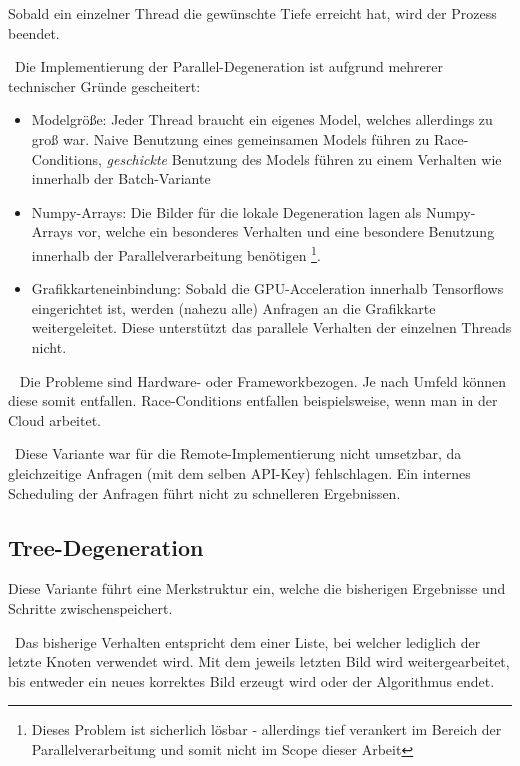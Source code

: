 Sobald ein einzelner Thread die gewünschte Tiefe erreicht hat, wird der Prozess beendet. 

~\newline Die Implementierung der Parallel-Degeneration ist aufgrund mehrerer technischer Gründe gescheitert: 

\begin{itemize}
	\item Modelgröße: Jeder Thread braucht ein eigenes Model, welches allerdings zu groß war. Naive Benutzung eines gemeinsamen Models führen zu Race-Conditions, \textit{geschickte} Benutzung des Models führen zu einem Verhalten wie innerhalb der Batch-Variante
	\item Numpy-Arrays: Die Bilder für die lokale Degeneration lagen als Numpy-Arrays vor, welche ein besonderes Verhalten und eine besondere Benutzung innerhalb der Parallelverarbeitung benötigen \footnote{Dieses Problem ist sicherlich lösbar - allerdings tief verankert im Bereich der Parallelverarbeitung und somit nicht im Scope dieser Arbeit}. 
	\item Grafikkarteneinbindung: Sobald die GPU-Acceleration innerhalb Tensorflows eingerichtet ist, werden (nahezu alle) Anfragen an die Grafikkarte weitergeleitet. Diese unterstützt das parallele Verhalten der einzelnen Threads nicht. 
\end{itemize} 
~\newline 
Die Probleme sind Hardware- oder Frameworkbezogen. Je nach Umfeld können diese somit entfallen. Race-Conditions entfallen beispielsweise, wenn man in der Cloud arbeitet.

~\newline Diese Variante war für die Remote-Implementierung nicht umsetzbar, da gleichzeitige Anfragen (mit dem selben API-Key) fehlschlagen. Ein internes Scheduling der Anfragen führt nicht zu schnelleren Ergebnissen. 
\subsection{Tree-Degeneration}
Diese Variante führt eine Merkstruktur ein, welche die bisherigen Ergebnisse und Schritte zwischenspeichert. 

~\newline Das bisherige Verhalten entspricht dem einer Liste, bei welcher lediglich der letzte Knoten verwendet wird. Mit dem jeweils letzten Bild wird weitergearbeitet, bis entweder ein neues korrektes Bild erzeugt wird oder der Algorithmus endet. 

